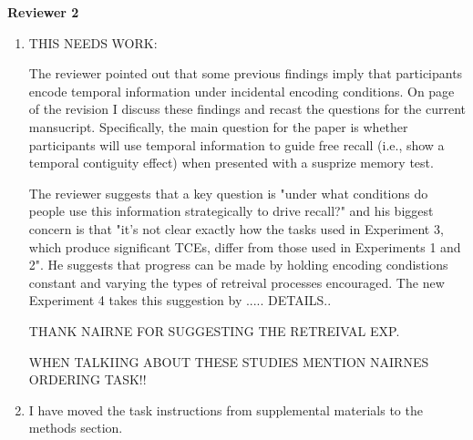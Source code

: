 \documentclass[12pt]{article}
\begin{document}
\textbf{\large{Reviewer 2}}

\begin{enumerate}

	\item 
	THIS NEEDS WORK:

	The reviewer pointed out that some previous findings imply that participants encode temporal information under incidental encoding conditions. On page \pageref{TODO-8} of the revision I discuss these findings and recast the questions for the current mansucript. Specifically, the main question for the paper is whether participants will use temporal information to guide free recall (i.e., show a temporal contiguity effect) when presented with a susprize memory test.

	The reviewer suggests that a key question is "under what conditions do people use this information strategically to drive recall?" and his biggest concern is that "it's not clear exactly how the tasks used in Experiment 3, which produce significant TCEs, differ from those used in Experiments 1 and 2". He suggests that progress can be made by holding encoding condistions constant and varying the types of retreival processes encouraged. The new Experiment 4 takes this suggestion by ..... DETAILS..

	THANK NAIRNE FOR SUGGESTING THE RETREIVAL EXP. 

	WHEN TALKIING ABOUT THESE STUDIES MENTION NAIRNES ORDERING TASK!!

	\item
	I have moved the task instructions from supplemental materials to the methods section.


\end{enumerate}
\end{document}
